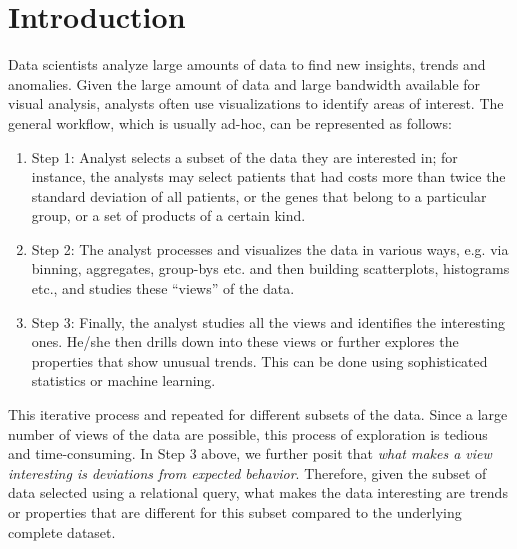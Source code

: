 \section{Introduction}
\label{sec:intro}


Data scientists analyze large amounts of data to find new insights, trends and
anomalies. Given the large amount of data and large bandwidth available for
visual analysis, analysts often use visualizations to identify areas of
interest. The general workflow, which is usually ad-hoc, can be represented as
follows:

\begin{enumerate}
  \item Step 1: Analyst selects a subset of the data they are interested in; for
  instance, the analysts may select patients that had costs more than twice the
  standard deviation of all patients, or the genes that belong to a particular
  group, or a set of products of a certain kind.
  \item Step 2: The analyst processes and visualizes the data in various ways,
  e.g. via binning, aggregates, group-bys etc. and then building scatterplots,
  histograms etc., and studies these ``views'' of the data.
  \item Step 3: Finally, the analyst studies all the views and identifies the
  interesting ones. He/she then drills down into these views or further explores
  the properties that show unusual trends. This can be done using sophisticated
  statistics or machine learning.
\end{enumerate}

This iterative process and repeated for different subsets of the data. Since a
large number of views of the data are possible, this process of exploration is
tedious and time-consuming. In Step 3 above, we further posit that {\it what
makes a view interesting is deviations from expected behavior}. Therefore, given
the subset of data selected using a relational query, what makes the data
interesting are trends or properties that are different for this subset compared
to the underlying complete dataset.

